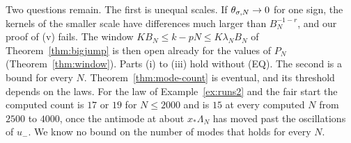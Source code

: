 \begin{remark}\label{rem:mode-open}
Two questions remain. The first is unequal scales. If $\theta_{\sigma,N}\to0$ for one sign, the
kernels of the smaller scale have differences much larger than $B_N^{-1-r}$, and our proof of
(v) fails. The window $KB_N\le k-pN\le K\lambda_NB_N$ of Theorem~\ref{thm:bigjump} is then open
already for the values of $P_N$ (Theorem~\ref{thm:window}). Parts (i) to (iii) hold without
(EQ). The second is a bound for every $N$. Theorem~\ref{thm:mode-count} is eventual, and its
threshold depends on the laws. For the law of Example~\ref{ex:runs2} and the fair start the computed
count is $17$ or $19$ for $N\le2000$ and is $15$ at every computed $N$ from $2500$ to $4000$, once the antimode at about $x_*\Lambda_N$
has moved past the oscillations of $u_\minus$. We know no bound on the number of modes that
holds for every $N$.
\end{remark}
